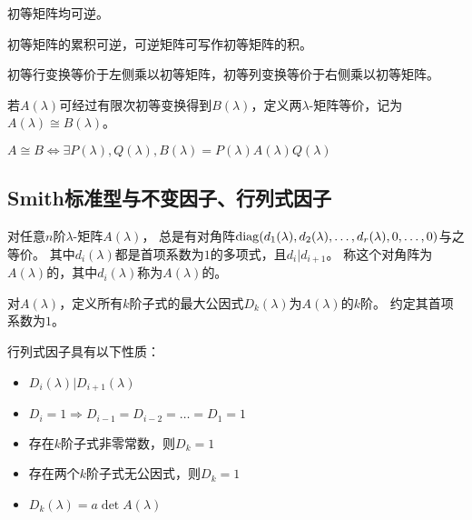 \begin{theorem}
    初等矩阵均可逆。
\end{theorem}

\begin{corollary}
    初等矩阵的累积可逆，可逆矩阵可写作初等矩阵的积。
\end{corollary}

\begin{theorem}
    初等行变换等价于左侧乘以初等矩阵，初等列变换等价于右侧乘以初等矩阵。
\end{theorem}

\begin{definition}
    若$A(\lambda)$可经过有限次初等变换得到$B(\lambda)$，定义两$\lambda$-矩阵等价，记为$A(\lambda)\cong B(\lambda)$。
\end{definition}

\begin{corollary}
$A\cong B \Leftrightarrow \exists P(\lambda),Q(\lambda), B(\lambda) = P(\lambda) A(\lambda) Q(\lambda)$
\end{corollary}

\subsection{Smith标准型与不变因子、行列式因子}

\begin{definition}
    对任意$n$阶$\lambda$-矩阵$A(\lambda)$，
    总是有对角阵$\DiagMatrix(d_1(\lambda),d_2(\lambda),\dots,\linebreak[1]d_r(\lambda),0,\dots,0)$与之等价。
    其中$d_i(\lambda)$都是首项系数为$1$的多项式，且$d_i|d_{i+1}$。
    称这个对角阵为$A(\lambda)$的，其中$d_i(\lambda)$称为$A(\lambda)$的。
\end{definition}

\begin{definition}[行列式因子]
    对$A(\lambda)$，定义所有$k$阶子式的最大公因式$D_k(\lambda)$为$A(\lambda)$的$k$阶。
    约定其首项系数为$1$。
\end{definition}

\begin{property}
    行列式因子具有以下性质：
    \begin{itemize}
        \item $D_i(\lambda)|D_{i+1}(\lambda)$
        \item $D_i=1\Rightarrow D_{i-1}=D_{i-2}=\dots=D_1=1$
        \item 存在$k$阶子式非零常数，则$D_k=1$
        \item 存在两个$k$阶子式无公因式，则$D_k=1$
        \item $D_k(\lambda)=a\det A(\lambda)$
    \end{itemize}
\end{property}

